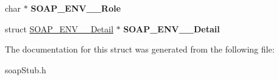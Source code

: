 \begin{DoxyCompactItemize}
\item 
\hypertarget{structSOAP__ENV____Fault_a9048c64196658de472d57fb42fae5daa}{
char $\ast$ {\bfseries SOAP\_\-ENV\_\-\_\-Role}}
\label{structSOAP__ENV____Fault_a9048c64196658de472d57fb42fae5daa}

\item 
\hypertarget{structSOAP__ENV____Fault_a560e6fd07a6b2f51cef97aa12282c870}{
struct \hyperlink{structSOAP__ENV____Detail}{SOAP\_\-ENV\_\-\_\-Detail} $\ast$ {\bfseries SOAP\_\-ENV\_\-\_\-Detail}}
\label{structSOAP__ENV____Fault_a560e6fd07a6b2f51cef97aa12282c870}

\end{DoxyCompactItemize}


The documentation for this struct was generated from the following file:\begin{DoxyCompactItemize}
\item 
soapStub.h\end{DoxyCompactItemize}
